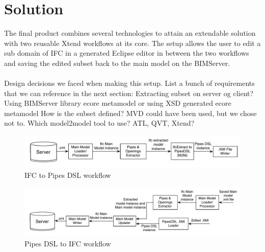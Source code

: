 \section{Solution}
The final product combines several technologies to attain an extendable solution with two reusable Xtend workflows at its core. The setup allows the user to edit a sub domain of IFC in a generated Eclipse editor in between the two workflows and saving the edited subset back to the main model on the BIMServer.
\paragraph{}
Design decisions we faced when making this setup. List a bunch of requirements that we can reference in the next section: 
Extracting subset on server og client?
Using BIMServer library ecore metamodel or using XSD generated ecore metamodel
How is the subset defined? MVD could have been used, but we chose not to.
Which model2model tool to use? ATL, QVT, Xtend?

\begin{figure}[htbp]
    \centering
        \includegraphics[width=120mm]{images/IFC2Pipes.pdf}
    \caption{IFC to Pipes DSL workflow}
    \label{fig:IFC2PipesWorkflow}
\end{figure}


\begin{figure}[htbp]
    \centering
        \includegraphics[width=120mm]{images/Pipes2IFC.pdf}
    \caption{Pipes DSL to IFC workflow}
    \label{fig:Pipes2IFCWorkflow}
\end{figure}